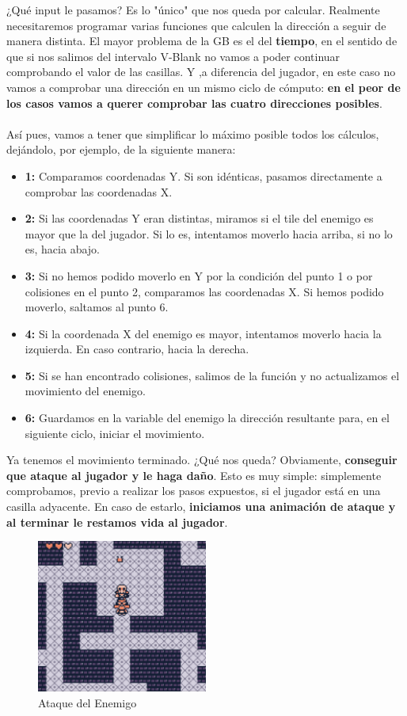 ¿Qué input le pasamos? Es lo "único" que nos queda por calcular. Realmente necesitaremos programar varias funciones que calculen la dirección a seguir de manera distinta. El mayor problema de la GB es el del \textbf{tiempo}, en el sentido de que si nos salimos del intervalo V-Blank no vamos a poder continuar comprobando el valor de las casillas. Y ,a diferencia del jugador, en este caso no vamos a comprobar una dirección en un mismo ciclo de cómputo: \textbf{en el peor de los casos vamos a querer comprobar las cuatro direcciones posibles}.
\\ \\
Así pues, vamos a tener que simplificar lo máximo posible todos los cálculos, dejándolo, por ejemplo, de la siguiente manera:

\begin{itemize}
	\item \textbf{1:} Comparamos coordenadas Y. Si son idénticas, pasamos directamente a comprobar las coordenadas X.
	\item \textbf{2:} Si las coordenadas Y eran distintas, miramos si el tile del enemigo es mayor que la del jugador. Si lo es, intentamos moverlo hacia arriba, si no lo es, hacia abajo.
	\item \textbf{3:} Si no hemos podido moverlo en Y por la condición del punto 1 o por colisiones en el punto 2, comparamos las coordenadas X. Si hemos podido moverlo, saltamos al punto 6.
	\item \textbf{4:} Si la coordenada X del enemigo es mayor, intentamos moverlo hacia la izquierda. En caso contrario, hacia la derecha.
	\item \textbf{5:} Si se han encontrado colisiones, salimos de la función y no actualizamos el movimiento del enemigo.
	\item \textbf{6:} Guardamos en la variable del enemigo la dirección resultante para, en el siguiente ciclo, iniciar el movimiento.
\end{itemize}

Ya tenemos el movimiento terminado. ¿Qué nos queda? Obviamente, \textbf{conseguir que ataque al jugador y le haga daño}. Esto es muy simple: simplemente comprobamos, previo a realizar los pasos expuestos, si el jugador está en una casilla adyacente. En caso de estarlo, \textbf{iniciamos una animación de ataque y al terminar le restamos vida al jugador}.

\begin{figure}[h]
\centering
\includegraphics[width=0.5\textwidth]{include/images/desarrollo/enemy_attack.png}
\caption{Ataque del Enemigo}
\label{figure:enemy_attack}
\end{figure}

